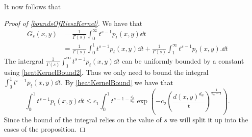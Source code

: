 It now follows that

\begin{proof}[Proof of \cref{boundsOfRieszKernel}]
	We have that
	\begin{align}
		G_s(x,y) &= \frac{1}{\Gamma(s)}\int_{0}^{\infty} t^{s-1}p_t(x,y) \dd t \\
		&=\frac{1}{\Gamma(s)}\int_{0}^{1} t^{s-1}p_t(x,y) \dd t + \frac{1}{\Gamma(s)}\int_{1}^{\infty} t^{s-1}p_t(x,y). \dd t 
	\end{align}
	The intergral $\frac{1}{\Gamma(s)}\int_{1}^{\infty} t^{s-1}p_t(x,y) \dd t$ can be uniformly bounded by a constant using \cref{heatKernelBound2}. Thus we only need to bound the integral $\int_{0}^{1} t^{s-1}p_t(x,y) \dd t$. By \eqref{heatKernelBound} we have that
	\begin{equation}
		\int_{0}^{1} t^{s-1}p_t(x,y) \dd t \leq c_1 \int_{0}^{1} t^{s-1-\frac{d_h}{d_w}} \exp\left(-c_2 \left(\frac{d(x,y)^{d_w}}{t}\right)^{\frac{1}{d_w -1}}\right).
	\end{equation}
	Since the bound of the integral relies on the value of $s$ we will split it up into the cases of the proposition.
	

\end{proof}
